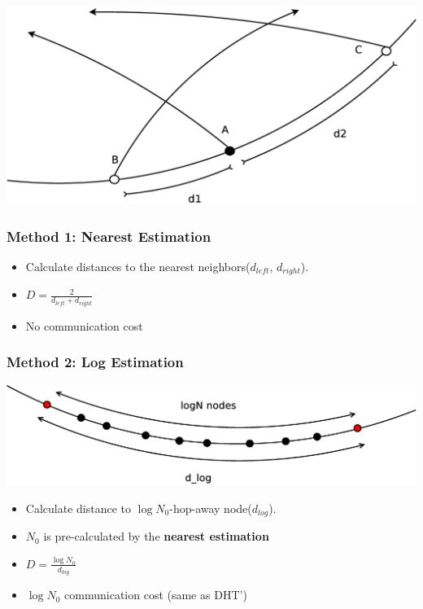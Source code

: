 \documentclass[red]{beamer}
\begin{document}
\begin{frame}
\centering
\includegraphics[scale=0.15]{figs/method1}
\frametitle{Method 1: Nearest Estimation}
\begin{itemize}
\item Calculate distances to the nearest neighbors($d_{left}$, $d_{right}$). 
\item $D = \frac{2}{d_{left}+d_{right}}$
\item No communication cost
\end{itemize}
\end{frame}
\begin{frame}
\frametitle{Method 2: Log Estimation}
\centering
\includegraphics[scale=0.2]{figs/method2}
\begin{itemize}
\item Calculate distance to $\log{N_0}$-hop-away node($d_{log}$).
\item $N_0$ is pre-calculated by the \textbf{nearest estimation}
\item $D = \frac{\log{N_0}}{d_{log}}$
\item $\log{N_0}$ communication cost (same as DHT')
\end{itemize}
\end{frame}
\end{document}

